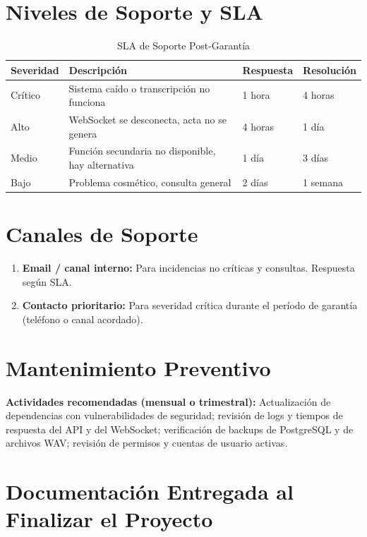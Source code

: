 \documentclass[12pt,a4paper]{report}
\begin{document}
\section{Niveles de Soporte y SLA}

\begin{table}[H]
\centering
\small
\begin{tabular}{|p{2.2cm}|p{4.5cm}|p{2.2cm}|p{3.5cm}|}
\hline
\rowcolor{primaryblue!20}
\textbf{Severidad} & \textbf{Descripción} & \textbf{Respuesta} & \textbf{Resolución} \\
\hline
Crítico & Sistema caído o transcripción no funciona & 1 hora & 4 horas \\
\hline
Alto & WebSocket se desconecta, acta no se genera & 4 horas & 1 día \\
\hline
Medio & Función secundaria no disponible, hay alternativa & 1 día & 3 días \\
\hline
Bajo & Problema cosmético, consulta general & 2 días & 1 semana \\
\hline
\end{tabular}
\caption{SLA de Soporte Post-Garantía}
\end{table}

\section{Canales de Soporte}

\begin{enumerate}
    \item \textbf{Email / canal interno:} Para incidencias no críticas y consultas. Respuesta según SLA.
    \item \textbf{Contacto prioritario:} Para severidad crítica durante el período de garantía (teléfono o canal acordado).
\end{enumerate}

\section{Mantenimiento Preventivo}

\textbf{Actividades recomendadas (mensual o trimestral):} Actualización de dependencias con vulnerabilidades de seguridad; revisión de logs y tiempos de respuesta del API y del WebSocket; verificación de backups de PostgreSQL y de archivos WAV; revisión de permisos y cuentas de usuario activas.

\section{Documentación Entregada al Finalizar el Proyecto}
\end{document}
